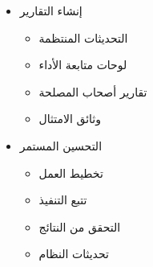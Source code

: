 \begin{itemize}
\begin{itemize}
        \item إنشاء التقارير
        \begin{itemize}
            \item التحديثات المنتظمة
            \item لوحات متابعة الأداء
            \item تقارير أصحاب المصلحة
            \item وثائق الامتثال
        \end{itemize}
        
        \item التحسين المستمر
        \begin{itemize}
            \item تخطيط العمل
            \item تتبع التنفيذ
            \item التحقق من النتائج
            \item تحديثات النظام
        \end{itemize}
    \end{itemize}
\end{itemize} 